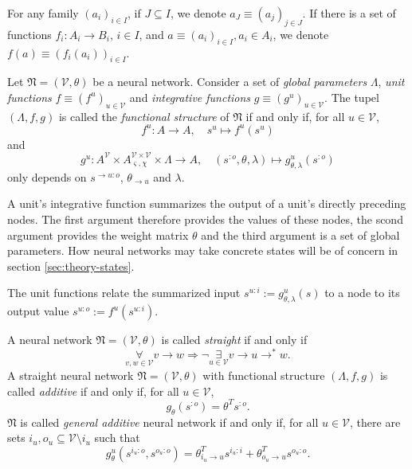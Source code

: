 \documentclass[a4paper,11pt]{report}
\newcommand{\const}{\varsigma} %
\newcommand{\var}{\chi} %
\begin{document}
\begin{Not}
For any family $(a_i)_{i\in I}$, if $J\subseteq I$, we denote $a_J\equiv(a_j)_{j\in J}$. If there is a set of functions $f_i:A_i\to B_i$, $i\in I$, and $a\equiv(a_i)_{i\in I},a_i\in A_i$, we denote $f(a)\equiv\left(f_i(a_i)\right)_{i\in I}$.
\end{Not}

\begin{Def}
Let $\mathfrak{N}=(\mathcal{V},\theta)$ be a neural network.
Consider a set of \emph{global parameters} $\Lambda$, \emph{unit functions} $f\equiv\left(f^u\right)_{u\in\mathcal{V}}$ and \emph{integrative functions} $g\equiv\left(g^u\right)_{u\in\mathcal{V}}$.
The tupel $(\Lambda,f,g)$ is called the \emph{functional structure} of $\mathfrak{N}$ if and only if, for all $u\in\mathcal{V}$,
\begin{equation}
f^u:A\to A,\quad s^u\mapsto f^u(s^u)
\end{equation}
and
\begin{equation}
g^u:A^{\mathcal{V}}\times A_{\const,\var}^{\mathcal{V}\times\mathcal{V}}\times\Lambda\to A,
\quad
(s^{:o},\theta,\lambda)\mapsto g^u_{\theta,\lambda}(s^{:o})
\end{equation}
only depends on $s^{\to u:o}$, $\theta_{\to u}$ and $\lambda$.
\end{Def}

\begin{Par}
A unit's integrative function summarizes the output of a unit's directly preceding nodes. The first argument therefore provides the values of these nodes, the scond argument provides the weight matrix $\theta$ and the third argument is a set of global parameters. How neural networks may take concrete states will be of concern in section \ref{sec:theory-states}.
\end{Par}

\begin{Par}
The unit functions relate the summarized input $s^{u:i}:=g^u_{\theta,\lambda}(s)$ to a node to its output value $s^{u:o}:=f^u(s^{u:i})$.
\end{Par}

\begin{Def}
A neural network $\mathfrak{N}=(\mathcal{V},\theta)$ is called \emph{straight} if and only if
\[
\underset{v,w\in\mathcal{V}}{\forall}v\to w\Rightarrow\neg\underset{u\in\mathcal{V}}{\exists}v\to u\to^*w.
\]
A straight neural network $\mathfrak{N}=(\mathcal{V},\theta)$ with functional structure $(\Lambda,f,g)$ is called \emph{additive} if and only if, for all $u\in\mathcal{V}$,
\begin{equation}
g_{\theta}(s^{:o})=\theta^Ts^{:o}.
\end{equation}
$\mathfrak{N}$ is called \emph{general additive} neural network if and only if, for all $u\in\mathcal{V}$, there are sets $i_u,o_u\subseteq \mathcal{V}\setminus i_u$ such that
\begin{equation}
g^u_{\theta}(s^{i_u:o},s^{o_u:o})=\theta_{i_u\to u}^Ts^{i_u:i}+\theta_{o_u\to u}^Ts^{o_u:o}.
\end{equation}
\end{Def}
\end{document}
